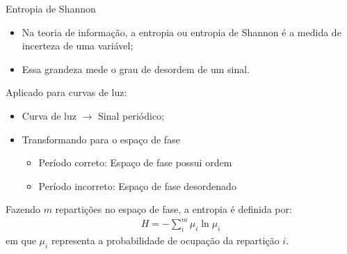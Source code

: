 \documentclass{beamer}
\begin{document}
\begin{frame}[allowframebreaks]{Entropia de Shannon}

\begin{itemize}
  \item Na teoria de informação, a entropia ou entropia de Shannon \citep{informationTheory} é a medida de incerteza de uma variável;
  \item Essa grandeza mede o grau de desordem de um sinal.
\end{itemize}

Aplicado para curvas de luz:
\begin{itemize}
  \item Curva de luz $\to$ Sinal periódico;
  \item Transformando para o espaço de fase
  \begin{itemize}
    \item Período correto: Espaço de fase possui ordem
    \item Período incorreto: Espaço de fase desordenado
      \end{itemize}
\end{itemize}

\framebreak

Fazendo $m$ repartições no espaço de fase, a entropia é definida por:
\begin{align}
H = - \sum_i^m \mu_i \ln \mu_i
\end{align}
em que $\mu_i$ representa a probabilidade de ocupação da repartição $i$.
\framebreak


\end{frame}
\end{document}
